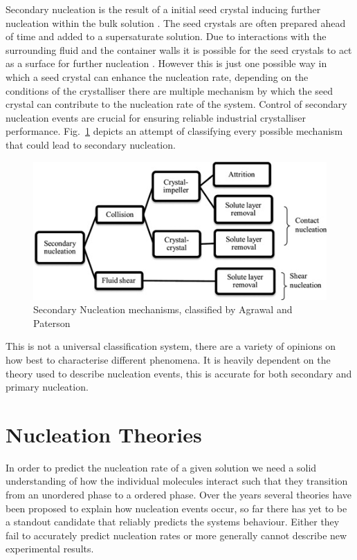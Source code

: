 Secondary nucleation is the result of a initial seed crystal 
inducing further nucleation within the bulk solution 
\cite{Botsaris1976}. The seed crystals are often prepared ahead 
of time and added to a supersaturate solution. Due to interactions 
with the surrounding fluid and the container walls it is possible 
for the seed crystals to act as a surface for further nucleation \cite{Anwar2015}. However this is just one possible way in which 
a seed crystal can enhance the nucleation rate, depending on the 
conditions of the crystalliser there are multiple mechanism by 
which the seed crystal can contribute to the nucleation rate of 
the system. Control of secondary nucleation events are crucial 
for ensuring reliable industrial crystalliser performance. Fig.~\ref{fig:secondary} depicts an attempt of classifying every 
possible mechanism that could lead to secondary nucleation.
\begin{figure}[h!]
	\centering
	\includegraphics[width=0.95\linewidth]{secondary_nucleation.jpg}
	\caption{Secondary Nucleation mechanisms, classified by
		Agrawal and Paterson \cite{Agrawal2015}}
	\label{fig:secondary}
\end{figure}

This is not a universal classification system, there are a 
variety of opinions on how best to characterise different 
phenomena. It is heavily dependent on the theory used to 
describe nucleation events, this is accurate for both 
secondary and primary nucleation.

\section{Nucleation Theories}
In order to predict the nucleation rate of a given solution
we need a solid understanding of how the individual molecules
interact such that they transition from an unordered phase to
a ordered phase. Over the years several theories have been 
proposed to explain how nucleation events occur, so far there
has yet to be a standout candidate that reliably predicts 
the systems behaviour. Either they fail to accurately predict
nucleation rates or more generally cannot describe new 
experimental results.

